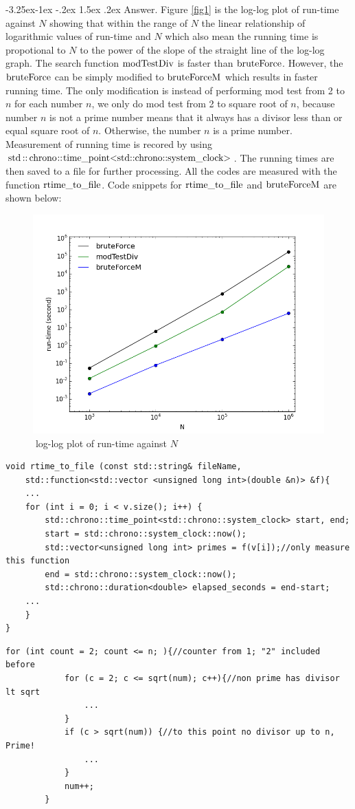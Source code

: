 \documentclass[a4paper,12pt]{article}%
\makeatletter
\renewcommand\subsubsection{\@startsection{subsection}{2}{\z@}%
                                     {-3.25ex\@plus -1ex \@minus -.2ex}%
                                     {1.5ex \@plus .2ex}%
                                     {\normalfont\bfseries\itshape}}%
\makeatother
\begin{document}
\subsubsection{Answer.}
Figure \eqref{fig1} is the log-log plot of run-time against $N$ showing that within the range of $N$ the linear relationship of logarithmic values of run-time and $N$ which also mean the running time is propotional to $N$ to the power of the slope of the straight line of the log-log graph. The search function $\lstinline{modTestDiv}$ is faster than $\lstinline{bruteForce}$. However, the $\lstinline{bruteForce}$ can be simply modified to $\lstinline{bruteForceM}$ which results in faster running time. The only modification is instead of performing mod test from 2 to $n$ for each number $n$, we only do mod test from 2 to square root of $n$, because number $n$ is not a prime number means that it always has a divisor less than or equal square root of $n$. Otherwise, the number $n$ is a prime number. Measurement of running time is recored by using $\lstinline{std::chrono::time_point<std::chrono::system_clock>}$. The running times are then saved to a file for further processing. All the codes are measured with the function $\lstinline{rtime_to_file}$. Code snippets for  $\lstinline{rtime_to_file}$ and $\lstinline{bruteForceM}$  are shown below:
\begin{figure}[h]
\centering
\includegraphics[width=0.8\linewidth, height=0.5\linewidth]{rt-vs-n.png}
\caption{log-log plot of run-time against $N$}
\label{fig1}
\end{figure}
\begin{lstlisting}[title = $\lstinline{rtime_to_file}$]
void rtime_to_file (const std::string& fileName, 
    std::function<std::vector <unsigned long int>(double &n)> &f){    
 	...
    for (int i = 0; i < v.size(); i++) {
        std::chrono::time_point<std::chrono::system_clock> start, end;
        start = std::chrono::system_clock::now();
        std::vector<unsigned long int> primes = f(v[i]);//only measure this function
        end = std::chrono::system_clock::now();
        std::chrono::duration<double> elapsed_seconds = end-start;
 	...    
    }
}
\end{lstlisting}
\begin{lstlisting}[title = $\lstinline{bruteForceM}$]
for (int count = 2; count <= n; ){//counter from 1; "2" included before
            for (c = 2; c <= sqrt(num); c++){//non prime has divisor lt sqrt
                ...
            }
            if (c > sqrt(num)) {//to this point no divisor up to n, Prime!
                ...
            }
            num++;  
        }
\end{lstlisting}
\end{document}

